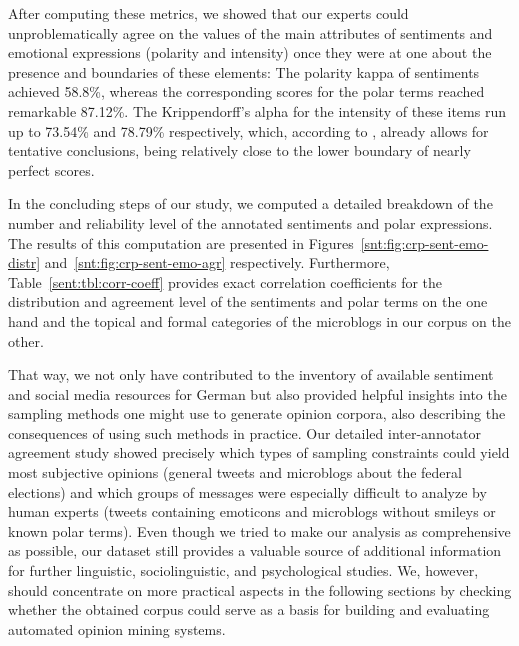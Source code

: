 After computing these metrics, we showed that our experts could
unproblematically agree on the values of the main attributes of
sentiments and emotional expressions (polarity and intensity) once
they were at one about the presence and boundaries of these elements:
The polarity kappa of sentiments achieved 58.8\%, whereas the
corresponding scores for the polar terms reached remarkable 87.12\%.
The Krippendorff's alpha for the intensity of these items run up to
73.54\% and 78.79\% respectively, which, according to
\citet{Krippendorff:07}, already allows for tentative conclusions,
being relatively close to the lower boundary of nearly perfect scores.

In the concluding steps of our study, we computed a detailed breakdown
of the number and reliability level of the annotated sentiments and
polar expressions.  The results of this computation are presented in
Figures~\ref{snt:fig:crp-sent-emo-distr}
and~\ref{snt:fig:crp-sent-emo-agr} respectively.  Furthermore,
Table~\ref{sent:tbl:corr-coeff} provides exact correlation
coefficients for the distribution and agreement level of the
sentiments and polar terms on the one hand and the topical and formal
categories of the microblogs in our corpus on the other.

That way, we not only have contributed to the inventory of available
sentiment and social media resources for German but also provided
helpful insights into the sampling methods one might use to generate
opinion corpora, also describing the consequences of using such
methods in practice.  Our detailed inter-annotator agreement study
showed precisely which types of sampling constraints could yield most
subjective opinions (general tweets and microblogs about the federal
elections) and which groups of messages were especially difficult to
analyze by human experts (tweets containing emoticons and microblogs
without smileys or known polar terms).  Even though we tried to make
our analysis as comprehensive as possible, our dataset still provides
a valuable source of additional information for further linguistic,
sociolinguistic, and psychological studies.  We, however, should
concentrate on more practical aspects in the following sections by
checking whether the obtained corpus could serve as a basis for
building and evaluating automated opinion mining systems.

\newpage
